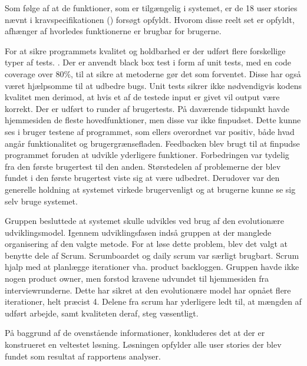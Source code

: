 Som følge af at de funktioner, som er tilgængelig i systemet, er de 18 user stories nævnt i kravspecifikationen () forsøgt opfyldt. 
Hvorom disse reelt set er opfyldt, afhænger af hvorledes funktionerne er brugbar for brugerne.

For at sikre programmets kvalitet og holdbarhed er der udført flere forskellige typer af tests. . Der er anvendt black box test i form af unit tests, med en code coverage over 80\%, til at sikre at metoderne gør det som forventet. Disse har også været hjælpsomme til at udbedre bugs. Unit tests sikrer ikke nødvendigvis kodens kvalitet men derimod, at hvis et af de testede input er givet vil output være korrekt. Der er udført to runder af brugertests. På daværende tidspunkt havde hjemmesiden de fleste hovedfunktioner, men disse var ikke finpudset. Dette kunne ses i bruger testene af programmet, som ellers overordnet var positiv, både hvad angår funktionalitet og brugergrænsefladen. Feedbacken blev brugt til at finpudse programmet foruden at udvikle yderligere funktioner. Forbedringen var tydelig fra den første brugertest til den anden.
Størstedelen af problemerne der blev fundet i den første brugertest viste sig at være udbedret. Derudover var den generelle holdning at systemet virkede brugervenligt og at brugerne kunne se sig selv bruge systemet.

Gruppen besluttede at systemet skulle udvikles ved brug af den evolutionære udviklingsmodel. Igennem udviklingsfasen indså gruppen at der manglede organisering af den valgte metode. For at løse dette problem, blev det valgt at benytte dele af Scrum. Scrumboardet og daily scrum var særligt brugbart. Scrum hjalp med at planlægge iterationer vha. product backloggen.
Gruppen havde ikke nogen product owner, men forstod kravene udvundet til hjemmesiden fra interviewrunderne. Dette har sikret at den evolutionære model har opnået flere iterationer, helt præcist 4. Delene fra scrum har yderligere  ledt til, at mængden af udført arbejde, samt kvaliteten deraf, steg væsentligt.

På baggrund af de ovenstående informationer, konkluderes det at der er konstrueret en veltestet  løsning. Løsningen opfylder alle user stories der blev fundet som resultat af rapportens analyser.

